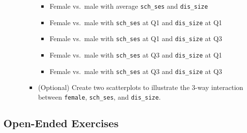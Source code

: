 \documentclass[
]{krantz}
\providecommand{\tightlist}{%
  \setlength{\itemsep}{0pt}\setlength{\parskip}{0pt}}
\begin{document}
\begin{enumerate}
\begin{enumerate}
\begin{itemize}
      \begin{itemize}
      \tightlist
      \item
        Female vs.~male with average \texttt{sch\_ses} and \texttt{dis\_size}
      \item
        Female vs.~male with \texttt{sch\_ses} at Q1 and \texttt{dis\_size} at Q1
      \item
        Female vs.~male with \texttt{sch\_ses} at Q1 and \texttt{dis\_size} at Q3
      \item
        Female vs.~male with \texttt{sch\_ses} at Q3 and \texttt{dis\_size} at Q1
      \item
        Female vs.~male with \texttt{sch\_ses} at Q3 and \texttt{dis\_size} at Q3
      \end{itemize}
    \item
      (Optional) Create two scatterplots to illustrate the 3-way interaction between \texttt{female}, \texttt{sch\_ses}, and \texttt{dis\_size}.
    \end{itemize}
  \end{enumerate}
\end{enumerate}

\hypertarget{open-ended-exercises-6}{%
\subsection{Open-Ended Exercises}\label{open-ended-exercises-6}}
\end{document}
